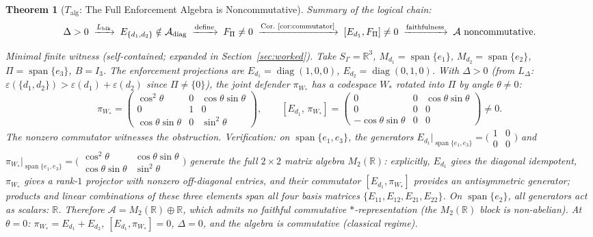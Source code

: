 \documentclass[11pt,a4paper]{article}
\newtheorem{theorem}{Theorem}[section]
\theoremstyle{definition}
\newcommand{\eps}{\varepsilon}
\DeclareMathOperator{\spn}{span}
\DeclareMathOperator{\diag}{diag}
\begin{document}
\begin{theorem}[$T_{\mathrm{alg}}$: The Full Enforcement Algebra is Noncommutative]
\smallskip\noindent\textit{Summary of the logical chain:}
\[
\Delta > 0 \;\xrightarrow{L_{\mathrm{blk}}}\; E_{\{d_1,d_2\}} \notin \mathcal{A}_{\mathrm{diag}} \;\xrightarrow{\text{define}}\; F_\Pi \ne 0 \;\xrightarrow{\text{Cor.~\ref{cor:commutator}}}\; [E_{d_1}, F_\Pi] \ne 0 \;\xrightarrow{\text{faithfulness}}\; \mathcal{A} \text{ noncommutative}.
\]

\smallskip\noindent\textit{Minimal finite witness} (self-contained; expanded in Section~\ref{sec:worked}).  Take $S_\Gamma = \mathbb{R}^3$, $M_{d_1} = \spn\{e_1\}$, $M_{d_2} = \spn\{e_2\}$, $\Pi = \spn\{e_3\}$, $B = I_3$.  The enforcement projections are $E_{d_1} = \diag(1,0,0)$, $E_{d_2} = \diag(0,1,0)$.  With $\Delta > 0$ (from $L_\Delta$: $\eps(\{d_1,d_2\}) > \eps(d_1) + \eps(d_2)$ since $\Pi \ne \{0\}$), the joint defender $\pi_{W_*}$ has a codespace $W_*$ rotated into $\Pi$ by angle $\theta \ne 0$:
\[
\pi_{W_*} = \begin{pmatrix} \cos^2\!\theta & 0 & \cos\theta\sin\theta \\ 0 & 1 & 0 \\ \cos\theta\sin\theta & 0 & \sin^2\!\theta \end{pmatrix}, \qquad
[E_{d_1},\, \pi_{W_*}] = \begin{pmatrix} 0 & 0 & \cos\theta\sin\theta \\ 0 & 0 & 0 \\ -\cos\theta\sin\theta & 0 & 0 \end{pmatrix} \ne 0.
\]
The nonzero commutator witnesses the obstruction.  \textit{Verification:} on $\spn\{e_1, e_3\}$, the generators $E_{d_1}|_{\spn\{e_1,e_3\}} = \bigl(\begin{smallmatrix} 1 & 0 \\ 0 & 0 \end{smallmatrix}\bigr)$ and $\pi_{W_*}|_{\spn\{e_1,e_3\}} = \bigl(\begin{smallmatrix} \cos^2\!\theta & \cos\theta\sin\theta \\ \cos\theta\sin\theta & \sin^2\!\theta \end{smallmatrix}\bigr)$ generate the full $2 \times 2$ matrix algebra $M_2(\mathbb{R})$: explicitly, $E_{d_1}$ gives the diagonal idempotent, $\pi_{W_*}$ gives a rank-$1$ projector with nonzero off-diagonal entries, and their commutator $[E_{d_1}, \pi_{W_*}]$ provides an antisymmetric generator; products and linear combinations of these three elements span all four basis matrices $\{E_{11}, E_{12}, E_{21}, E_{22}\}$.  On $\spn\{e_2\}$, all generators act as scalars: $\mathbb{R}$.  Therefore $\mathcal{A} = M_2(\mathbb{R}) \oplus \mathbb{R}$, which admits no faithful commutative $*$-representation (the $M_2(\mathbb{R})$ block is non-abelian).  At $\theta = 0$: $\pi_{W_*} = E_{d_1} + E_{d_2}$, $[E_{d_1}, \pi_{W_*}] = 0$, $\Delta = 0$, and the algebra is commutative (classical regime).


\end{theorem}
\end{document}
